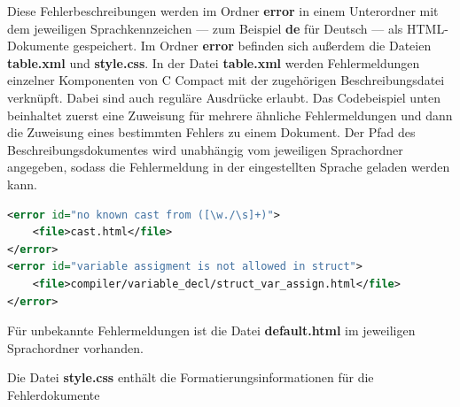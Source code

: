 Diese Fehlerbeschreibungen werden im Ordner \textbf{error} in einem Unterordner mit dem jeweiligen Sprachkennzeichen --- zum Beispiel \textbf{de} für Deutsch --- als HTML-Dokumente gespeichert. Im Ordner \textbf{error} befinden sich außerdem die Dateien \textbf{table.xml} und \textbf{style.css}. In der Datei \textbf{table.xml} werden Fehlermeldungen einzelner Komponenten von C Compact mit der zugehörigen Beschreibungsdatei verknüpft. Dabei sind auch reguläre Ausdrücke erlaubt. Das Codebeispiel unten beinhaltet zuerst eine Zuweisung für mehrere ähnliche Fehlermeldungen und dann die Zuweisung eines bestimmten Fehlers zu einem Dokument. Der Pfad des Beschreibungsdokumentes wird unabhängig vom jeweiligen Sprachordner angegeben, sodass die Fehlermeldung in der eingestellten Sprache geladen werden kann.
\begin{lstlisting}[language=XML]
<error id="no known cast from ([\w./\s]+)">
	<file>cast.html</file>
</error>
<error id="variable assigment is not allowed in struct">
	<file>compiler/variable_decl/struct_var_assign.html</file>
</error>
\end{lstlisting}

Für unbekannte Fehlermeldungen ist die Datei \textbf{default.html} im jeweiligen Sprachordner vorhanden.

Die Datei \textbf{style.css} enthält die Formatierungsinformationen für die Fehlerdokumente


